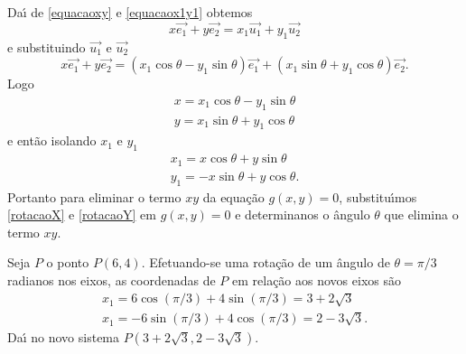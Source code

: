 Da{\'\i} de \eqref{equacaoxy} e \eqref{equacaox1y1} obtemos
\[
  x\vec{e_1} + y\vec{e_2} = x_1\vec{u_1} + y_1\vec{u_2}
\]
e substituindo $\vec{u_1}$ e $\vec{u_2}$
\[
  x\vec{e_1} + y\vec{e_2} = (x_1\cos\theta - y_1\sin\theta)\vec{e_1} + (x_1\sin\theta + y_1\cos\theta)\vec{e_2}.
\]
Logo
\begin{align}
  x = x_1\cos\theta - y_1\sin\theta\label{rotacaoX}\\
  y = x_1\sin\theta + y_1\cos\theta\label{rotacaoY}
\end{align}
e ent\~ao isolando $x_1$ e $y_1$
\begin{align*}
  x_1 = x\cos\theta + y\sin\theta\\
  y_1 = -x\sin\theta + y\cos\theta.
\end{align*}
Portanto para eliminar o termo $xy$ da equa\c{c}\~ao $g(x,y) = 0$, substitu{\'\i}mos \eqref{rotacaoX} e \eqref{rotacaoY} em $g(x,y) = 0$ e determinanos o \^angulo $\theta$ que elimina o termo $xy$.

\begin{exemplos}
  Seja $P$ o ponto $P(6,4)$. Efetuando-se uma rota\c{c}\~ao de um \^angulo de $\theta = \pi/3$ radianos nos eixos, as coordenadas de $P$ em rela\c{c}\~ao aos novos eixos s\~ao
    \begin{align*}
      x_1 = 6\cos(\pi/3) + 4\sin(\pi/3) = 3 + 2\sqrt{3}\\
      x_1 = -6\sin(\pi/3) + 4\cos(\pi/3) = 2 - 3\sqrt{3}.
    \end{align*}
    Da{\'\i} no novo sistema $P(3 + 2\sqrt{3}, 2 - 3\sqrt{3})$.
\end{exemplos}

